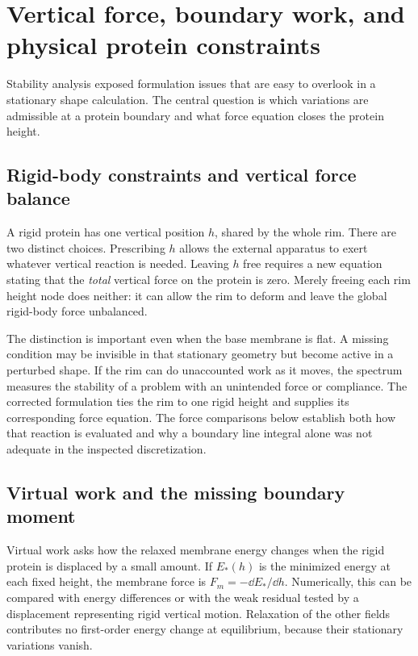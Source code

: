 

\section{Vertical force, boundary work, and physical protein constraints}\label{sec:force}
Stability analysis exposed formulation issues that are easy to overlook in a stationary shape calculation. The central question is which variations are admissible at a protein boundary and what force equation closes the protein height.


\subsection{Rigid-body constraints and vertical force balance}
A rigid protein has one vertical position $h$, shared by the whole rim. There are two distinct choices. Prescribing $h$ allows the external apparatus to exert whatever vertical reaction is needed. Leaving $h$ free requires a new equation stating that the \emph{total} vertical force on the protein is zero. Merely freeing each rim height node does neither: it can allow the rim to deform and leave the global rigid-body force unbalanced.

The distinction is important even when the base membrane is flat. A missing condition may be invisible in that stationary geometry but become active in a perturbed shape. If the rim can do unaccounted work as it moves, the spectrum measures the stability of a problem with an unintended force or compliance. The corrected formulation ties the rim to one rigid height and supplies its corresponding force equation. The force comparisons below establish both how that reaction is evaluated and why a boundary line integral alone was not adequate in the inspected discretization.


\subsection{Virtual work and the missing boundary moment}


Virtual work asks how the relaxed membrane energy changes when the rigid protein is displaced by a small amount. If $E_*(h)$ is the minimized energy at each fixed height, the membrane force is $F_m=-\dd E_*/\dd h$. Numerically, this can be compared with energy differences or with the weak residual tested by a displacement representing rigid vertical motion. Relaxation of the other fields contributes no first-order energy change at equilibrium, because their stationary variations vanish.

